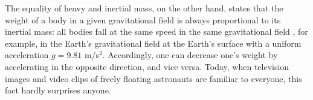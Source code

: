 The equality of heavy and inertial mass, on the other hand, 
states that the weight of a body in a given 
gravitational field is always proportional to its inertial mass:
all bodies fall at the same speed in the same gravitational field
\cite[pp. 37, 269ff]{Born-2001},
for example, in the Earth's gravitational field at the Earth's surface with a uniform
acceleration $g = 9.81$ m/s$^2$.
Accordingly, one can decrease one's weight by accelerating in the opposite direction, and vice versa.
Today, when television images and video clips of freely floating
astronauts are familiar to everyone, this fact hardly surprises
anyone.
%
%
%
%
%
%
